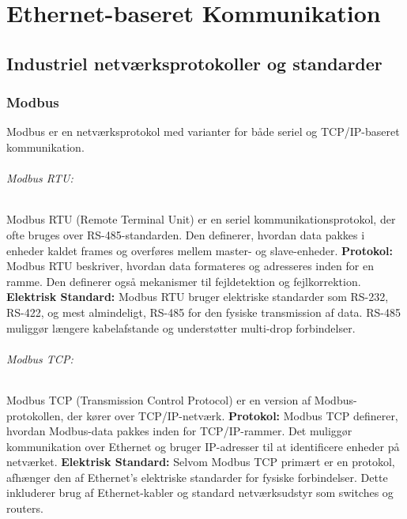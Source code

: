 \part{Ethernet-baseret Kommunikation}
\chapter{Industriel netværksprotokoller og standarder}	

\section{Modbus}
Modbus er en netværksprotokol med varianter for både seriel og TCP/IP-baseret kommunikation.

\paragraph{Modbus RTU:}
Modbus RTU (Remote Terminal Unit) er en seriel kommunikationsprotokol, der ofte bruges over RS-485-standarden. Den definerer, hvordan data pakkes i enheder kaldet frames og overføres mellem master- og slave-enheder.
\newline\newline 
\noindent\textbf{Protokol:} Modbus RTU beskriver, hvordan data formateres og adresseres inden for en ramme. Den definerer også mekanismer til fejldetektion og fejlkorrektion.
\newline\newline
\noindent\textbf{Elektrisk Standard:} Modbus RTU bruger elektriske standarder som RS-232, RS-422, og mest almindeligt, RS-485 for den fysiske transmission af data. RS-485 muliggør længere kabelafstande og understøtter multi-drop forbindelser.

\paragraph{Modbus TCP:}
Modbus TCP (Transmission Control Protocol) er en version af Modbus-protokollen, der kører over TCP/IP-netværk.
\newline\newline
\noindent\textbf{Protokol:} Modbus TCP definerer, hvordan Modbus-data pakkes inden for TCP/IP-rammer. Det muliggør kommunikation over Ethernet og bruger IP-adresser til at identificere enheder på netværket.
\newline\newline
\noindent\textbf{Elektrisk Standard:} Selvom Modbus TCP primært er en protokol, afhænger den af Ethernet's elektriske standarder for fysiske forbindelser. Dette inkluderer brug af Ethernet-kabler og standard netværksudstyr som switches og routers.

